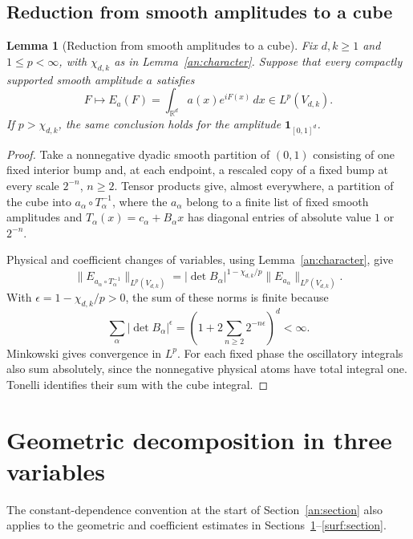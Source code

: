 \documentclass[11pt]{amsart}
\newtheorem{lemma}[theorem]{Lemma}
\theoremstyle{definition}
\theoremstyle{remark}
\numberwithin{equation}{section}
\begin{document}
\subsection{Reduction from smooth amplitudes to a cube}\label{completion:cube}\label{an:cube-subsection}

\begin{lemma}[Reduction from smooth amplitudes to a cube]\label{an:cube-reduction}
Fix $d,k\ge1$ and $1\le p<\infty$, with $\chi_{d,k}$ as in Lemma~\ref{an:character}. Suppose that every compactly supported smooth amplitude $a$ satisfies
\[
F\longmapsto E_a(F)=\int_{\mathbb R^d}a(x)e^{iF(x)}\,dx\in L^p(V_{d,k}).
\]
If $p>\chi_{d,k}$, the same conclusion holds for the amplitude $\mathbf1_{[0,1]^d}$.
\end{lemma}
\begin{proof}
Take a nonnegative dyadic smooth partition of $(0,1)$ consisting of one fixed interior bump and, at each endpoint, a rescaled copy of a fixed bump at every scale $2^{-n}$, $n\ge2$. Tensor products give, almost everywhere, a partition of the cube into $a_\alpha\circ T_\alpha^{-1}$, where the $a_\alpha$ belong to a finite list of fixed smooth amplitudes and $T_\alpha(x)=c_\alpha+B_\alpha x$ has diagonal entries of absolute value $1$ or $2^{-n}$.

Physical and coefficient changes of variables, using Lemma~\ref{an:character}, give
\begin{equation}\label{an:atom-scaling}
\|E_{a_\alpha\circ T_\alpha^{-1}}\|_{L^p(V_{d,k})}=|\det B_\alpha|^{1-\chi_{d,k}/p}\|E_{a_\alpha}\|_{L^p(V_{d,k})}.
\end{equation}
With $\epsilon=1-\chi_{d,k}/p>0$, the sum of these norms is finite because
\[
\sum_\alpha|\det B_\alpha|^\epsilon=\left(1+2\sum_{n\ge2}2^{-n\epsilon}\right)^d<\infty.
\]
Minkowski gives convergence in $L^p$. For each fixed phase the oscillatory integrals also sum absolutely, since the nonnegative physical atoms have total integral one. Tonelli identifies their sum with the cube integral.
\end{proof}

\section{Geometric decomposition in three variables}\label{geo:section}

The constant-dependence convention at the start of Section~\ref{an:section} also applies to the geometric and coefficient estimates in Sections~\ref{geo:section}--\ref{surf:section}.
\end{document}
